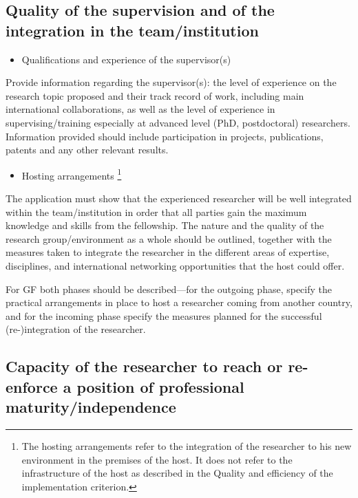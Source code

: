 \subsection{Quality of the supervision and of the integration in the team/institution}
\label{sec:excellence_supervision}

\begin{itemize}
  \item Qualifications and experience of the supervisor(s)
\end{itemize}

\noindent
Provide information regarding the supervisor(s): the level of
experience on the research topic proposed and their track record
of work, including main international collaborations, as well as
the level of experience in supervising/training especially at
advanced level (PhD, postdoctoral) researchers.  Information
provided should include participation in projects, publications,
patents and any other relevant results.

\begin{itemize}
  \item Hosting arrangements%
\footnote{The hosting arrangements refer to the integration of the researcher to his new environment in the premises of the host. 
It does not refer to the infrastructure of the host as described in the Quality and efficiency of the implementation criterion.}
\end{itemize}

\noindent
The application must show that the experienced researcher will be well integrated within the team/institution in order that all parties gain the maximum knowledge and skills from the fellowship.
The nature and the quality of the research group/environment as a whole should be outlined, 
together with the measures taken to integrate the researcher in the different areas of expertise, disciplines, and international networking opportunities that the host could offer.

\medskip\noindent
For GF both phases should be described\----for the outgoing phase, specify the practical arrangements in place to host a researcher coming from another country, 
and for the incoming phase specify the measures planned for the successful (re-)integration of the researcher.




\subsection{Capacity of the researcher to reach or re-enforce a position of professional maturity/independence}
\label{sec:excellence_maturity}

